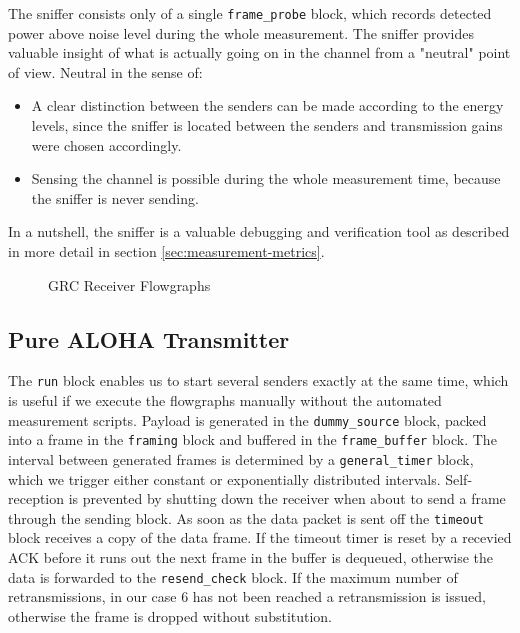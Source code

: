 The sniffer consists only of a single \texttt{frame\_probe} block, which records detected power above noise level during the whole measurement. The sniffer provides valuable insight of what is actually going on in the channel from a "neutral" point of view. Neutral in the sense of:

\begin{itemize}
	\item A clear distinction between the senders can be made according to the energy levels, since the sniffer is located between the senders and transmission gains were chosen accordingly.
	\item Sensing the channel is possible during the whole measurement time, because the sniffer is never sending.
\end{itemize}

In a nutshell, the sniffer is a valuable debugging and verification tool as described in more detail in section \ref{sec:measurement-metrics}.

\begin{figure}
	\label{fig:grc-receiver}
	\begin{center}
		\vskip 40pt
	\end{center}
	\caption{GRC Receiver Flowgraphs}
\end{figure}

\subsection{Pure ALOHA Transmitter}
The \texttt{run} block enables us to start several senders exactly at the same time, which is useful if we execute the flowgraphs manually without the automated measurement scripts. Payload is generated in the \texttt{dummy\_source} block, packed into a frame in the \texttt{framing} block and buffered in the \texttt{frame\_buffer} block. The interval between generated frames is determined by a \texttt{general\_timer} block, which we trigger either constant or exponentially distributed intervals. Self-reception is prevented by shutting down the receiver when about to send a frame through the sending block. As soon as the data packet is sent off the \texttt{timeout} block receives a copy of the data frame. If the timeout timer is reset by a recevied ACK before it runs out the next frame in the buffer is dequeued, otherwise the data is forwarded to the \texttt{resend\_check} block. If the maximum number of retransmissions, in our case 6 has not been reached a retransmission is issued, otherwise the frame is dropped without substitution.

